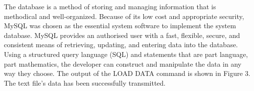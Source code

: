 \documentclass[10pt,a4paper,twoside]{article}
\begin{document}
\vspace{0.3cm}

The database is a method of storing and managing information that is methodical and well-organized.
Because of its low cost and appropriate security, MySQL was chosen as the essential system software to implement the system database. MySQL provides an authorised user with a fast, flexible, secure, and consistent means of retrieving, updating, and entering data into the database.
Using a structured query language (SQL) and statements that are part language, part mathematics, the developer can construct and manipulate the data in any way they choose.
The output of the LOAD DATA command is shown in Figure 3. The text file's data has been successfully transmitted.
\end{document}
